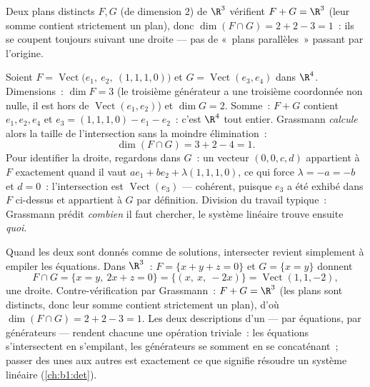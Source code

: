 \begin{example}\label{ex:b1:findim:planes}
Deux plans distincts $F, G$ (de dimension $2$) de $\R^3$ vérifient
$F + G = \R^3$ (leur somme contient strictement un plan), donc
$\dim(F \cap G) = 2 + 2 - 3 = 1$~: ils se coupent toujours suivant une
droite --- pas de «~plans parallèles~» passant par l'origine.
\end{example}

\begin{example}
\label{ex:b1:findim:grassmannrun}
Soient $F = \operatorname{Vect}\bigl(e_1,\ e_2,\ (1,1,1,0)\bigr)$
et $G = \operatorname{Vect}(e_3, e_4)$ dans $\R^4$. Dimensions~:
$\dim F = 3$ (le troisième générateur a une troisième coordonnée non
nulle, il est hors de $\operatorname{Vect}(e_1, e_2)$) et $\dim G = 2$.
Somme~: $F + G$ contient $e_1, e_2, e_4$ et $e_3 = (1,1,1,0) - e_1 -
e_2$~: c'est $\R^4$ tout entier. Grassmann \emph{calcule} alors la
taille de l'intersection sans la moindre élimination~:
\[
\dim(F \cap G) = 3 + 2 - 4 = 1 .
\]
Pour identifier la droite, regardons dans $G$~: un vecteur $(0, 0, c, d)$
appartient à $F$ exactement quand il vaut $a e_1 + b e_2 + \lambda(1,1,1,0)$,
ce qui force $\lambda = -a = -b$ et $d = 0$~: l'intersection est
$\operatorname{Vect}(e_3)$ --- cohérent, puisque $e_3$ a été exhibé
dans $F$ ci-dessus et appartient à $G$ par définition. Division du
travail typique~: Grassmann prédit \emph{combien} il faut chercher,
le système linéaire trouve ensuite \emph{quoi}.
\end{example}

\begin{example}
\label{ex:b1:findim:intersectequations}
Quand les deux  sont donnés comme  de solutions,
intersecter revient simplement à empiler les équations. Dans $\R^3$~:
$F = \{x + y + z = 0\}$ et $G = \{x = y\}$ donnent
\[
F \cap G = \{x = y,\ 2x + z = 0\}
= \{(x,\ x,\ -2x)\} = \operatorname{Vect}(1, 1, -2),
\]
une droite. Contre-vérification par Grassmann~: $F + G = \R^3$ (les
plans sont distincts, donc leur somme contient strictement un plan),
d'où $\dim(F\cap G) = 2 + 2 - 3 = 1$. Les deux descriptions d'un
 --- par équations, par générateurs --- rendent chacune une
opération triviale~: les équations s'intersectent en s'empilant, les
générateurs se somment en se concaténant~; passer des unes aux autres
est exactement ce que signifie résoudre un système linéaire
(\cref{ch:b1:det}).
\end{example}

